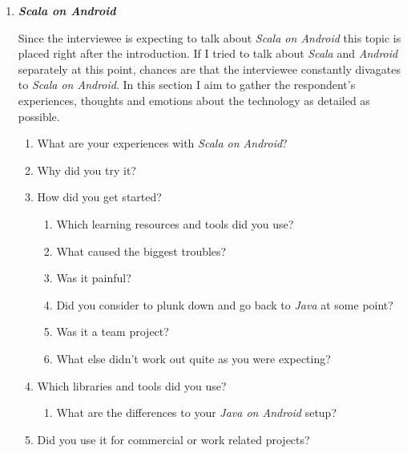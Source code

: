 \begin{enumerate}
	\item \textbf{\textit{Scala on Android}}

	Since the interviewee is expecting to talk about \textit{Scala on Android} this topic is placed right after the introduction. If I tried to talk about \textit{Scala} and \textit{Android} separately at this point, chances are that the interviewee constantly divagates to \textit{Scala on Android}. In this section I aim to gather the respondent's experiences, thoughts and emotions about the technology as detailed as possible.

	\begin{enumerate}

		\item What are your experiences with \textit{Scala on Android}?

		\item Why did you try it?

		\item How did you get started?

		\begin{enumerate}

			\item Which learning resources and tools did you use?

			\item What caused the biggest troubles?

			\item Was it painful?

			\item Did you consider to plunk down and go back to \textit{Java} at some point?

			\item Was it a team project?

			\item What else didn't work out quite as you were expecting?

		\end{enumerate}

		\item Which libraries and tools did you use?

		\begin{enumerate}

			\item What are the differences to your \textit{Java on Android} setup?

		\end{enumerate}

		\item Did you use it for commercial or work related projects?


\end{enumerate}
\end{enumerate}
